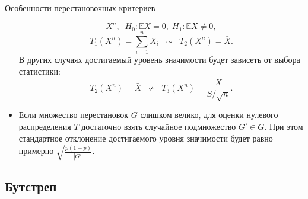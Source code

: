 \documentclass[9pt,pdf,utf8,hyperref={unicode},aspectratio=169]{beamer}
\begin{document}
\begin{frame}{Особенности перестановочных критериев}
\begin{itemize}
 $$X^n, \;\; H_0\colon \mathbb{E}X = 0, \; H_1\colon \mathbb{E}X \neq 0,$$
 $$T_1\left(X^n\right) = \sum\limits_{i=1}^n X_i \;\;\sim \;\; T_2\left(X^n\right) = \bar{X}.$$
 В других случаях достигаемый уровень значимости будет зависеть от выбора статистики:
 $$T_2\left(X^n\right) = \bar{X} \;\; \nsim \;\; T_3\left(X^n\right) = \frac{\bar{X}}{S/\sqrt{n}}.$$
 \item Если множество перестановок $G$ слишком велико, для оценки нулевого распределения $T$ достаточно взять случайное подмножество $G'\in G.$ При этом стандартное отклонение достигаемого уровня значимости будет равно примерно $\sqrt{\frac{p\left(1-p\right)}{\left|G'\right|}}.$
 \end{itemize}
\end{frame}

\subsection{Бутстреп}
\end{document}
